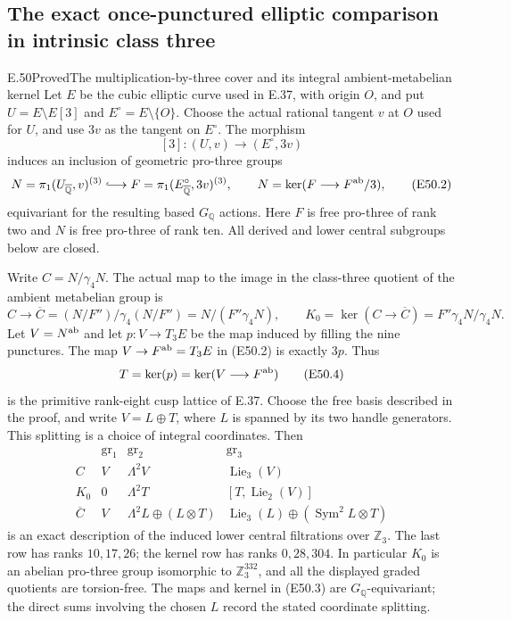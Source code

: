 \subsection{The exact once-punctured elliptic comparison in intrinsic class three}

\begin{statement}{E.50}{Proved}{The multiplication-by-three cover and its integral ambient-metabelian kernel}
Let $E$ be the cubic elliptic curve used in E.37, with
origin $O$, and put $U=E\setminus E[3]$ and
$E^\circ=E\setminus\{O\}$. Choose the actual rational
tangent $v$ at $O$ used for $U$, and use $3v$ as
the tangent on $E^\circ$. The morphism
\[
 [3]:(U,v)\longrightarrow(E^\circ,3v)
 \tag{E50.1}
\]
induces an inclusion of geometric pro-three groups
\[
 N=\pi_1(U_{\overline{\mathbb Q}},v)^{(3)}
 \lhook\joinrel\longrightarrow
 F=\pi_1(E^\circ_{\overline{\mathbb Q}},3v)^{(3)},
 \qquad N=\ker(F\longrightarrow F^{\rm ab}/3),
 \tag{E50.2}
\]
equivariant for the resulting based $G_{\mathbb Q}$
actions. Here $F$ is free pro-three of rank two and
$N$ is free pro-three of rank ten. All derived and
lower central subgroups below are closed.

Write $C=N/\gamma_4N$. The actual map to the image
in the class-three quotient of the ambient
metabelian group is
\[
 C\longrightarrow
 \overline C=(N/F'')/\gamma_4(N/F'')
       =N/(F''\gamma_4N),
 \qquad
 K_0=\ker(C\longrightarrow\overline C)
       =F''\gamma_4N/\gamma_4N.
 \tag{E50.3}
\]
Let $V=N^{\rm ab}$ and let $p:V\to T_3E$ be
the map induced by filling the nine punctures.
The map $V\to F^{\rm ab}=T_3E$ in (E50.2) is
exactly $3p$. Thus
\[
 T=\ker(p)=\ker(V\longrightarrow F^{\rm ab})
 \tag{E50.4}
\]
is the primitive rank-eight cusp lattice of E.37.
Choose the free basis described in the proof,
and write $V=L\oplus T$, where $L$ is spanned by
its two handle generators. This splitting is a
choice of integral coordinates. Then
\[
 \begin{array}{c|ccc}
  &\operatorname{gr}_1&\operatorname{gr}_2&\operatorname{gr}_3\\ \hline
 C&V&\Lambda^2V&\operatorname{Lie}_3(V)\\
 K_0&0&\Lambda^2T&[T,\operatorname{Lie}_2(V)]\\
 \overline C&V&\Lambda^2L\oplus(L\otimes T)&
      \operatorname{Lie}_3(L)\oplus
                      (\operatorname{Sym}^2L\otimes T)
 \end{array}
 \tag{E50.5}
\]
is an exact description of the induced lower
central filtrations over $\mathbb Z_3$. The last
row has ranks $10,17,26$; the kernel row has
ranks $0,28,304$. In particular $K_0$ is an
abelian pro-three group isomorphic to
$\mathbb Z_3^{332}$, and all the displayed
graded quotients are torsion-free. The maps and
kernel in (E50.3) are $G_{\mathbb Q}$-equivariant;
the direct sums involving the chosen $L$ record
the stated coordinate splitting.


\end{statement}

